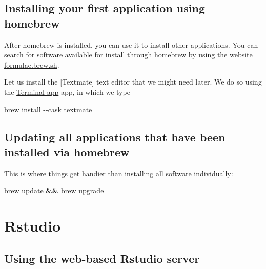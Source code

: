 \documentclass[
]{book}
\newenvironment{Shaded}{\begin{snugshade}}{\end{snugshade}}
\newcommand{\AttributeTok}[1]{\textcolor[rgb]{0.77,0.63,0.00}{#1}}
\newcommand{\ExtensionTok}[1]{#1}
\newcommand{\KeywordTok}[1]{\textcolor[rgb]{0.13,0.29,0.53}{\textbf{#1}}}
\newcommand{\NormalTok}[1]{#1}
\begin{document}
\hypertarget{installing-your-first-application-using-homebrew}{%
\subsection{Installing your first application using homebrew}\label{installing-your-first-application-using-homebrew}}

After homebrew is installed, you can use it to install other applications. You can search for software available for install through homebrew by using the website \href{https://formulae.brew.sh}{formulae.brew.sh}.

Let us install the {[}Textmate{]} text editor that we might need later. We do so using the \protect\hyperlink{MacTerminal}{Terminal app} app, in which we type

\begin{Shaded}
\begin{Highlighting}[]
\ExtensionTok{brew}\NormalTok{ install }\AttributeTok{{-}{-}cask}\NormalTok{ textmate}
\end{Highlighting}
\end{Shaded}

\hypertarget{updating-all-applications-that-have-been-installed-via-homebrew}{%
\subsection{Updating all applications that have been installed via homebrew}\label{updating-all-applications-that-have-been-installed-via-homebrew}}

This is where things get handier than installing all software individually:

\begin{Shaded}
\begin{Highlighting}[]
\ExtensionTok{brew}\NormalTok{ update }\KeywordTok{\&\&} \ExtensionTok{brew}\NormalTok{ upgrade}
\end{Highlighting}
\end{Shaded}

\hypertarget{rstudio}{%
\section{Rstudio}\label{rstudio}}

\hypertarget{using-the-web-based-rstudio-server}{%
\subsection{Using the web-based Rstudio server}\label{using-the-web-based-rstudio-server}}
\end{document}
